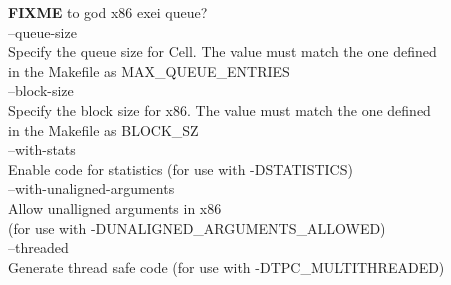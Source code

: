 \documentclass[letterpaper]{article}
\begin{document}
\textbf{FIXME} to god x86 exei queue?\\
  --queue-size\\
          Specify the queue size for Cell. The value must match the one defined\\
          in the Makefile as MAX\_QUEUE\_ENTRIES\\

  --block-size\\
          Specify the block size for x86.  The value must match the one defined\\
          in the Makefile as BLOCK\_SZ\\

  --with-stats\\
          Enable code for statistics (for use with -DSTATISTICS)\\

  --with-unaligned-arguments\\
          Allow unalligned arguments in x86\\
          (for use with -DUNALIGNED\_ARGUMENTS\_ALLOWED)\\

  --threaded\\
          Generate thread safe code (for use with -DTPC\_MULTITHREADED)\\
\end{document}
